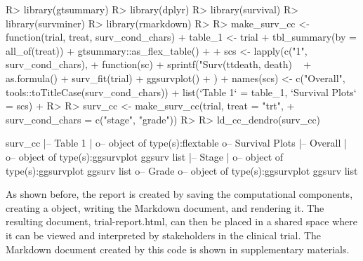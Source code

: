 \documentclass[
]{jss}
\begin{document}
\begin{CodeChunk}
\begin{CodeInput}
R> library(gtsummary)
R> library(dplyr)
R> library(survival)
R> library(survminer)
R> library(rmarkdown)
R> 
R> make_surv_cc <- function(trial, treat, surv_cond_chars) {
+   table_1 <- trial %
+     tbl_summary(by = all_of(treat)) %
+     gtsummary::as_flex_table()
+ 
+   scs <- lapply(c("1", surv_cond_chars),
+                 function(sc) {
+                   sprintf("Surv(ttdeath, death) ~ %
+                     as.formula() %
+                     surv_fit(trial) %
+                     ggsurvplot()
+                 })
+   names(scs) <- c("Overall", tools::toTitleCase(surv_cond_chars))
+   list(`Table 1` = table_1, `Survival Plots` = scs)
+ }
R> 
R> surv_cc <- make_surv_cc(trial, treat = "trt",
+                         surv_cond_chars = c("stage", "grade"))
R> 
R> ld_cc_dendro(surv_cc)
\end{CodeInput}
\begin{CodeOutput}

surv_cc
  |-- Table 1
  |  o-- object of type(s):flextable
  o-- Survival Plots
   |-- Overall
   |  o-- object of type(s):ggsurvplot ggsurv list
   |-- Stage
   |  o-- object of type(s):ggsurvplot ggsurv list
   o-- Grade
      o-- object of type(s):ggsurvplot ggsurv list
\end{CodeOutput}
\end{CodeChunk}

As shown before, the report is created by saving the computational
components, creating a  object, writing the 
Markdown document, and rendering it. The resulting document,
trial-report.html, can then be placed in a shared space where it can be
viewed and interpreted by stakeholders in the clinical trial. The
 Markdown document created by this code is shown in
supplementary materials.
\end{document}
